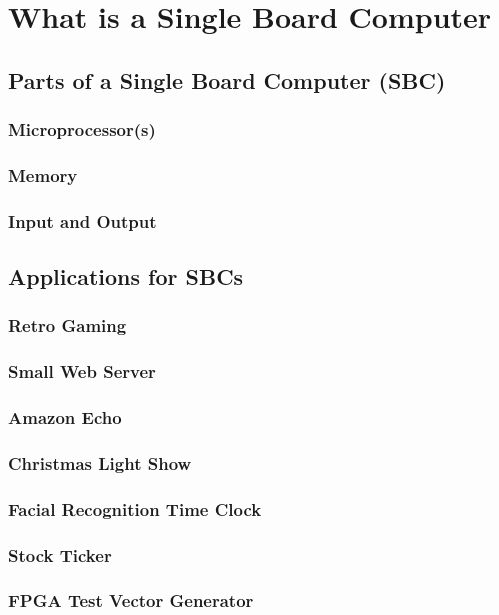 \chapter{What is a Single Board Computer}

\section{Parts of a Single Board Computer (SBC)}
\subsection{Microprocessor(s)}
\subsection{Memory}
\subsection{Input and Output}

\section{Applications for SBCs}
\subsection{Retro Gaming}
\subsection{Small Web Server}
\subsection{Amazon Echo}
\subsection{Christmas Light Show}
\subsection{Facial Recognition Time Clock}
\subsection{Stock Ticker}
\subsection{FPGA Test Vector Generator}


